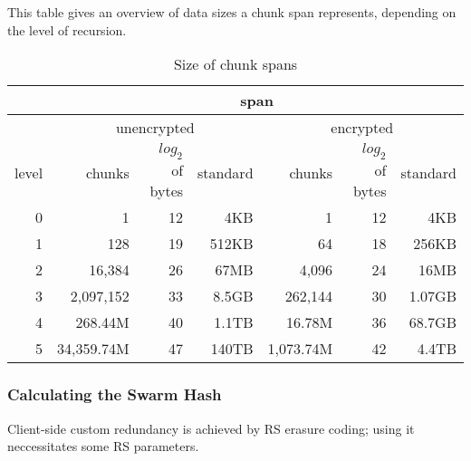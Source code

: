 
This table gives an overview of data sizes a chunk span represents, depending on the level of recursion.

\begin{table}[ht]
\begin{tabular}{|r||r|r|r||r|r|r|}
\hline
&\multicolumn{6}{|c|}{span}\\\hline
&\multicolumn{3}{|c|}{unencrypted}
&\multicolumn{3}{|c|}{encrypted}\\\hline
level & chunks & $\mathit{log}_2$ of bytes & standard & chunks & $\mathit{log}_2$ of bytes & standard \\
\hline\hline
0 & 1 & 12 & 4KB & 1 & 12 & 4KB \\\hline
1 & 128 & 19 & 512KB & 64 & 18 & 256KB \\\hline
2 & 16,384 & 26 & 67MB & 4,096 & 24 & 16MB \\\hline
3 & 2,097,152 &33 & 8.5GB & 262,144 &  30 & 1.07GB\\\hline
4 & 268.44M & 40  & 1.1TB & 16.78M & 36 & 68.7GB\\\hline
5 & 34,359.74M & 47 & 140TB & 1,073.74M & 42  & 4.4TB\\\hline
\end{tabular}
\caption{Size of chunk spans}
\end{table}




\subsubsection{Calculating the Swarm Hash}

Client-side custom redundancy is achieved by RS erasure coding; using it neccessitates some RS parameters.
      
